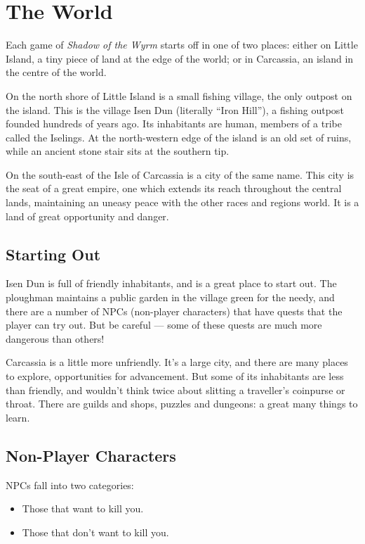 \section{The World}

Each game of {\it Shadow of the Wyrm} starts off in one of two places: 
either on Little Island, a tiny piece of land at the edge of the world;
or in Carcassia, an island in the centre of the world.

On the north shore of Little Island is a small fishing village, the only
outpost on the island.  This is the village Isen Dun (literally 
``Iron Hill''), a fishing outpost founded hundreds of years ago.  Its
inhabitants are human, members of a tribe called the Iselings.  At the 
north-western edge of the island is an old set of ruins, while an ancient
stone stair sits at the southern tip.

On the south-east of the Isle of Carcassia is a city of the same name.  
This city is the seat of a great empire, one which extends its reach 
throughout the central lands, maintaining an uneasy peace with the other 
races and regions world.  It is a land of great opportunity and danger.

\subsection{Starting Out}

Isen Dun is full of friendly inhabitants, and is a great place to start
out.  The ploughman maintains a public garden in the village green for the
needy, and there are a number of NPCs (non-player characters) that have
quests that the player can try out.  But be careful --- some of these quests
are much more dangerous than others! 

Carcassia is a little more unfriendly.  It's a large city, and there are
many places to explore, opportunities for advancement.  But some of its
inhabitants are less than friendly, and wouldn't think twice about 
slitting a traveller's coinpurse or throat.  There are guilds and shops,
puzzles and dungeons: a great many things to learn.

\subsection{Non-Player Characters}

NPCs fall into two categories:

\begin{itemize}
\item Those that want to kill you.
\item Those that don't want to kill you.
\end{itemize}


